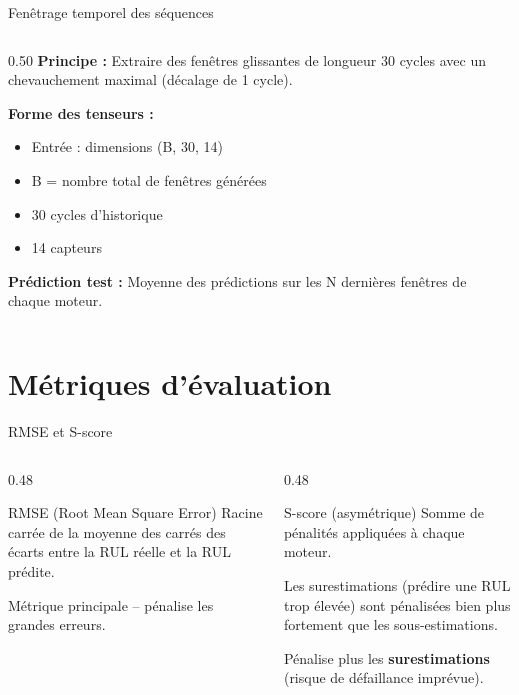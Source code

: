 \documentclass[aspectratio=169,11pt]{beamer}
\begin{document}
\begin{frame}{Fenêtrage temporel des séquences}
\begin{columns}[T]
\begin{column}{0.50\textwidth}
\textbf{Principe :} Extraire des fenêtres glissantes de longueur 30 cycles avec un chevauchement maximal (décalage de 1 cycle).
\vspace{0.3cm}

\textbf{Forme des tenseurs :}
\begin{itemize}
    \item Entrée : dimensions (B, 30, 14)
    \item B = nombre total de fenêtres générées
    \item 30 cycles d'historique
    \item 14 capteurs
\end{itemize}
\vspace{0.3cm}
\textbf{Prédiction test :} Moyenne des prédictions sur les N dernières fenêtres de chaque moteur.
\end{column}
\end{columns}
\end{frame}

\section{Métriques d'évaluation}

\begin{frame}{RMSE et S-score}
\begin{columns}[T]
\begin{column}{0.48\textwidth}
\begin{block}{RMSE (Root Mean Square Error)}
\centering
Racine carrée de la moyenne des carrés des écarts entre la RUL réelle et la RUL prédite.
\vspace{0.1cm}

Métrique principale -- pénalise les grandes erreurs.
\end{block}
\end{column}
\begin{column}{0.48\textwidth}
\begin{alertblock}{S-score (asymétrique)}
\centering
Somme de pénalités appliquées à chaque moteur.

Les surestimations (prédire une RUL trop élevée) sont pénalisées bien plus fortement que les sous-estimations.
\vspace{0.1cm}

Pénalise plus les \textbf{surestimations} (risque de défaillance imprévue).
\end{alertblock}
\end{column}
\end{columns}
\end{frame}
\end{document}
